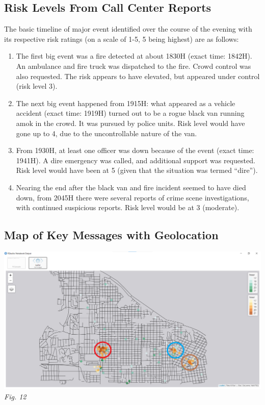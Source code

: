 \documentclass{acm_proc_article-sp}
\begin{document}
\hypertarget{risk-levels-from-call-center-reports}{%
\subsection{Risk Levels From Call Center
Reports}\label{risk-levels-from-call-center-reports}}

The basic timeline of major event identified over the course of the
evening with its respective risk ratings (on a scale of 1-5, 5 being
highest) are as follows:

\begin{enumerate}
\def\labelenumi{\arabic{enumi}.}
\item
  The first big event was a fire detected at about 1830H (exact time:
  1842H). An ambulance and fire truck was dispatched to the fire. Crowd
  control was also requested. The risk appears to have elevated, but
  appeared under control (risk level 3).
\item
  The next big event happened from 1915H: what appeared as a vehicle
  accident (exact time: 1919H) turned out to be a rogue black van
  running amok in the crowd. It was pursued by police units. Risk level
  would have gone up to 4, due to the uncontrollable nature of the van.
\item
  From 1930H, at least one officer was down because of the event (exact
  time: 1941H). A dire emergency was called, and additional support was
  requested. Risk level would have been at 5 (given that the situation
  was termed ``dire'').
\item
  Nearing the end after the black van and fire incident seemed to have
  died down, from 2045H there were several reports of crime scene
  investigations, with continued suspicious reports. Risk level would be
  at 3 (moderate).
\end{enumerate}

\hypertarget{map-of-key-messages-with-geolocation}{%
\subsection{Map of Key Messages with
Geolocation}\label{map-of-key-messages-with-geolocation}}

\includegraphics{img/image11.png} \emph{Fig. 12}
\end{document}

